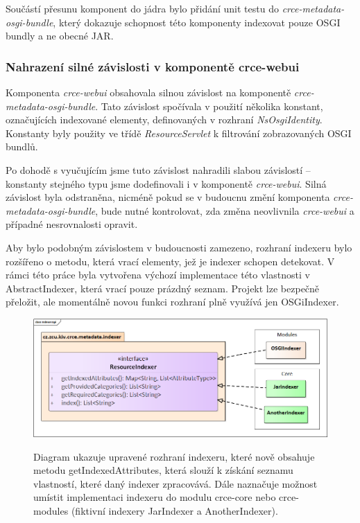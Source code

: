 \documentclass[12pt, a4paper]{article}
\begin{document}
Součástí přesunu komponent do jádra bylo přidání unit testu do \textit{crce-metadata-osgi-bundle}, který dokazuje schopnost této komponenty indexovat pouze OSGI bundly a ne obecné JAR.

\subsubsection{Nahrazení silné závislosti v komponentě crce-webui}
Komponenta \textit{crce-webui} obsahovala silnou závislost na komponentě \textit{crce-metadata-osgi-bundle}. Tato závislost spočívala v použití několika konstant, označujících indexované elementy, definovaných v rozhraní \textit{NsOsgiIdentity}. Konstanty byly použity ve třídě \textit{ResourceServlet} k filtrování zobrazovaných OSGI bundlů. 

Po dohodě s vyučujícím jsme tuto závislost nahradili slabou závislostí -- konstanty stejného typu jsme dodefinovali i v komponentě \textit{crce-webui}. Silná závislost byla odstraněna, nicméně pokud se v budoucnu změní komponenta \textit{crce-metadata-osgi-bundle}, bude nutné kontrolovat, zda změna neovlivnila \textit{crce-webui} a případné nesrovnalosti opravit.

Aby bylo podobným závislostem v budoucnosti zamezeno, rozhraní indexeru bylo rozšířeno o metodu, která vrací elementy, jež je indexer schopen detekovat. V rámci této práce byla vytvořena výchozí implementace této vlastnosti v AbstractIndexer, která vrací pouze prázdný seznam. Projekt lze bezpečně přeložit, ale momentálně novou funkci rozhraní plně využívá jen OSGiIndexer.

\begin{figure}[h!]
\centering
\includegraphics[width=135mm]{indexerApi.png}
\label{fig:indexerApi}
\caption{Diagram ukazuje upravené rozhraní indexeru, které nově obsahuje metodu getIndexedAttributes, která slouží k získání seznamu vlastností, které daný indexer zpracovává. Dále naznačuje možnost umístit implementaci indexeru do modulu crce-core nebo crce-modules (fiktivní indexery JarIndexer a AnotherIndexer).}
\end{figure}
\end{document}
